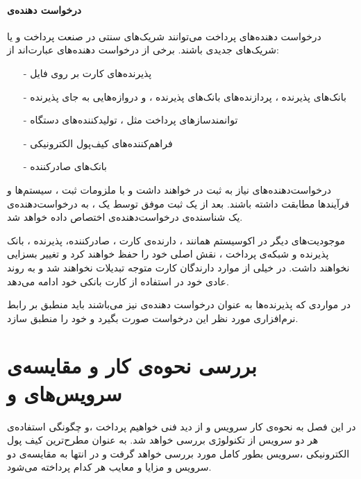 \documentclass[oneside]{report}
\begin{document}
\subsubsection{درخواست دهنده‌ی{\normalsize {}}}
درخواست دهنده‌های 
{\normalsize {}}
پرداخت می‌توانند شریک‌های سنتی در صنعت پرداخت و یا شریک‌های جدیدی باشند. برخی از درخواست دهنده‌های 
{\normalsize {}}
عبارت‌اند از: 
\begin{itemize}
	\item[-] پذیرنده‌های کارت بر روی فایل
	\item[-]بانک‌های پذیرنده ، پردازنده‌های بانک‌های پذیرنده ، و دروازه‌هایی به جای پذیرنده
	\item[-]توانمندسازهای پرداخت مثل ، 
	تولیدکننده‌های دستگاه
	{\normalsize {}}
	\item[-]فراهم‌کننده‌های کیف‌پول الکترونیکی
	\item[-] بانک‌های صادرکننده 
\end{itemize}
درخواست‌دهنده‌های 
{\normalsize {}}
نیاز به ثبت در 
{\normalsize {}}
خواهند داشت و با ملزومات ثبت ، سیستم‌ها و فرآیندها مطابقت داشته باشند. بعد از یک ثبت موفق توسط یک 
{\normalsize {}}
، به درخواست‌دهنده‌ی 
{\normalsize {}}
یک شناسنده‌ی درخواست‌دهنده‌ی 
{\normalsize {}}
اختصاص داده خواهد شد. 

موجودیت‌‌های دیگر در اکوسیستم 
			{\normalsize {}}
همانند ، دارنده‌ی کارت ، صادرکننده، پذیرنده ، بانک پذیرنده و شبکه‌ی پرداخت ، نقش اصلی خود را حفظ خواهند کرد و تغییر بسزایی نخواهند داشت. در خیلی از موارد دارندگان کارت متوجه تبدیلات  
{\normalsize {}}
نخواهند شد و به روند عادی خود در استفاده از کارت بانکی خود ادامه می‌دهد.

در مواردی که پذیرنده‌ها به عنوان درخواست دهنده‌ی 
{\normalsize {}}
نیز می‌باشند باید منطبق بر رابط نرم‌افزاری
{\normalsize {}}
مورد نظر این درخواست صورت بگیرد و خود را منطبق سازد. 
\cite{emvframework}

											
					
					
		\chapter{بررسی نحوه‌ی کار و مقایسه‌ی  سرویس‌های   {\Large{} }  و   {\Large{} }}\label{comparison}
		در این فصل به نحوه‌ی کار سرویس 
							{\normalsize {}} 
		و 
							{\normalsize {}}
	از دید فنی خواهیم پرداخت ،و چگونگی استفاده‌ی هر دو سرویس از تکنولوژی 
						{\normalsize {}} 
	بررسی خواهد شد. به عنوان مطرح‌ترین کیف پول الکترونیکی ،سرویس 
						{\normalsize {}}
 بطور کامل مورد بررسی خواهد گرفت و در انتها به مقایسه‌ی دو سرویس و مزایا و معایب هر کدام پرداخته می‌شود.
 
\end{document}
